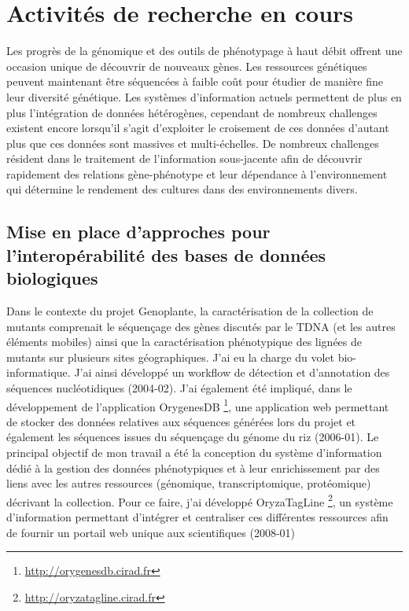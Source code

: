 \section{Activités de recherche en cours}

Les progrès de la génomique et des outils de phénotypage à haut débit offrent une occasion unique de découvrir de nouveaux gènes. Les ressources génétiques peuvent maintenant être séquencées à faible coût pour étudier de manière fine leur diversité génétique. Les systèmes d'information actuels permettent de plus en plus l'intégration de données hétérogènes, cependant de nombreux challenges existent encore lorsqu'il s'agit d'exploiter le croisement de ces données d'autant plus que ces données sont massives et multi-échelles. De nombreux challenges résident dans le traitement de l'information sous-jacente afin de découvrir rapidement des relations gène-phénotype et leur dépendance à l’environnement qui détermine le rendement des cultures dans des environnements divers.

\subsection*{Mise en place d’approches pour l’interopérabilité des bases de données biologiques}

Dans le contexte du projet Genoplante, la caractérisation de la collection de mutants comprenait le séquençage des gènes discutés par le TDNA (et les autres éléments mobiles) ainsi que la caractérisation phénotypique des lignées de mutants sur plusieurs sites géographiques. J'ai eu la charge du volet bio-informatique. J'ai ainsi développé un workflow de détection et d'annotation des séquences nucléotidiques (2004-02). J'ai également été impliqué, dans le développement de l'application OrygenesDB \footnote{\url{http://orygenesdb.cirad.fr}}, une application web permettant de stocker des données relatives aux séquences générées lors du projet et également les séquences issues du séquençage du génome du riz (2006-01). Le principal objectif de mon travail a été la conception du système d'information dédié à la gestion des données phénotypiques et à leur enrichissement par des liens avec les autres ressources (génomique, transcriptomique, protéomique) décrivant la collection. Pour ce faire, j’ai développé OryzaTagLine \footnote{\url{http://oryzatagline.cirad.fr}}, un système d’information permettant d’intégrer et centraliser ces différentes ressources afin de fournir un portail web unique aux scientifiques (2008-01)\\

